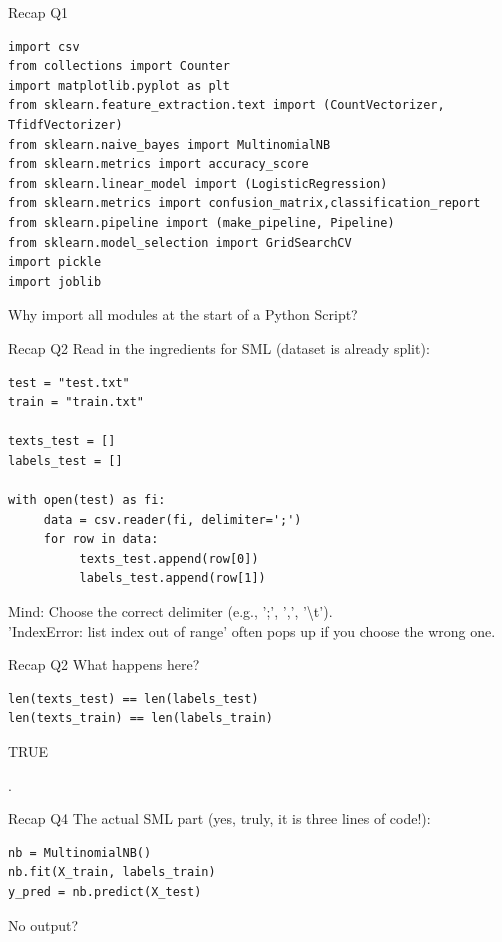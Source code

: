 \documentclass[handout]{beamer}
\begin{document}
\begin{frame}[fragile]{Recap Q1}
	
\begin{lstlisting}
import csv
from collections import Counter
import matplotlib.pyplot as plt
from sklearn.feature_extraction.text import (CountVectorizer, TfidfVectorizer)
from sklearn.naive_bayes import MultinomialNB
from sklearn.metrics import accuracy_score
from sklearn.linear_model import (LogisticRegression)
from sklearn.metrics import confusion_matrix,classification_report
from sklearn.pipeline import (make_pipeline, Pipeline)
from sklearn.model_selection import GridSearchCV
import pickle
import joblib
\end{lstlisting}
	
Why import all modules at the start of a Python Script?
\end{frame}


\begin{frame}[fragile]{Recap Q2}
Read in the ingredients for SML (dataset is already split):
\begin{lstlisting}
test = "test.txt"
train = "train.txt"

texts_test = []
labels_test = []

with open(test) as fi:
     data = csv.reader(fi, delimiter=';')
     for row in data:
          texts_test.append(row[0])
          labels_test.append(row[1])

\end{lstlisting}

Mind: Choose the correct delimiter (e.g., ';', ',', '\textbackslash t'). \\
'IndexError: list index out of range' often pops up if you choose the wrong one.
\end{frame}


\begin{frame}[fragile]{Recap Q2}
What happens here?
\begin{lstlisting}
len(texts_test) == len(labels_test)
len(texts_train) == len(labels_train)
\end{lstlisting}
	
\begin{lstlistingoutput}
TRUE
\end{lstlistingoutput}.
\end{frame}



\begin{frame}[fragile]{Recap Q4}
The actual SML part (yes, truly, it is three lines of code!):
\begin{lstlisting}
nb = MultinomialNB()
nb.fit(X_train, labels_train)
y_pred = nb.predict(X_test)
\end{lstlisting}
	
No output?
\end{frame}
\end{document}
